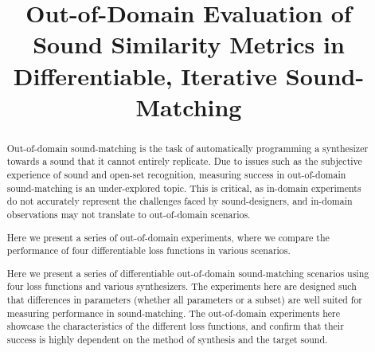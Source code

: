 \documentclass[runningheads]{llncs}
\begin{document}
\title{Out-of-Domain Evaluation of Sound Similarity Metrics in Differentiable, Iterative Sound-Matching}
%
%
%
\maketitle              %
%

\begin{abstract}
 Out-of-domain sound-matching is the task of automatically programming a synthesizer towards a sound that it cannot entirely replicate. Due to issues such as the subjective experience of sound and open-set recognition, measuring success in out-of-domain sound-matching is an under-explored topic. This is critical, as in-domain experiments do not accurately represent the challenges faced by sound-designers, and in-domain observations may not translate to out-of-domain scenarios. 
 
 Here we present a series of out-of-domain experiments, where we compare the performance of four differentiable loss functions in various scenarios. 

 
 Here we present a series of differentiable out-of-domain sound-matching scenarios using four loss functions and various synthesizers. The experiments here are designed such that differences in parameters (whether all parameters or a subset) are well suited for measuring performance in sound-matching. The out-of-domain experiments here showcase the characteristics of the different loss functions, and confirm that their success is highly dependent on the method of synthesis and the target sound. 
\end{abstract}
\end{document}
